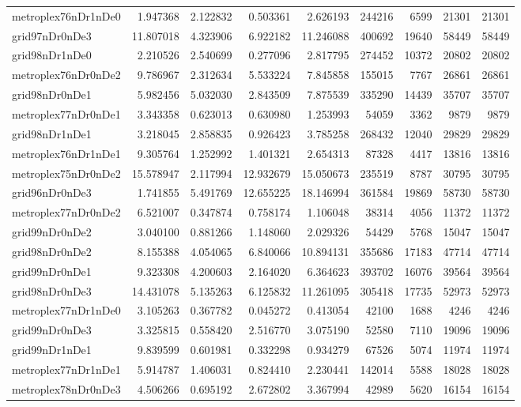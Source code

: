 \begin{longtable}{|l|r|r|r|r|r|r|r|r|}
metroplex76nDr1nDe0 & 1.947368 & 2.122832 & 0.503361 & 2.626193 & 244216 & 6599 & 21301 & 21301 \\
grid97nDr0nDe3 & 11.807018 & 4.323906 & 6.922182 & 11.246088 & 400692 & 19640 & 58449 & 58449 \\
grid98nDr1nDe0 & 2.210526 & 2.540699 & 0.277096 & 2.817795 & 274452 & 10372 & 20802 & 20802 \\
metroplex76nDr0nDe2 & 9.786967 & 2.312634 & 5.533224 & 7.845858 & 155015 & 7767 & 26861 & 26861 \\
grid98nDr0nDe1 & 5.982456 & 5.032030 & 2.843509 & 7.875539 & 335290 & 14439 & 35707 & 35707 \\
metroplex77nDr0nDe1 & 3.343358 & 0.623013 & 0.630980 & 1.253993 & 54059 & 3362 & 9879 & 9879 \\
grid98nDr1nDe1 & 3.218045 & 2.858835 & 0.926423 & 3.785258 & 268432 & 12040 & 29829 & 29829 \\
metroplex76nDr1nDe1 & 9.305764 & 1.252992 & 1.401321 & 2.654313 & 87328 & 4417 & 13816 & 13816 \\
metroplex75nDr0nDe2 & 15.578947 & 2.117994 & 12.932679 & 15.050673 & 235519 & 8787 & 30795 & 30795 \\
grid96nDr0nDe3 & 1.741855 & 5.491769 & 12.655225 & 18.146994 & 361584 & 19869 & 58730 & 58730 \\
metroplex77nDr0nDe2 & 6.521007 & 0.347874 & 0.758174 & 1.106048 & 38314 & 4056 & 11372 & 11372 \\
grid99nDr0nDe2 & 3.040100 & 0.881266 & 1.148060 & 2.029326 & 54429 & 5768 & 15047 & 15047 \\
grid98nDr0nDe2 & 8.155388 & 4.054065 & 6.840066 & 10.894131 & 355686 & 17183 & 47714 & 47714 \\
grid99nDr0nDe1 & 9.323308 & 4.200603 & 2.164020 & 6.364623 & 393702 & 16076 & 39564 & 39564 \\
grid98nDr0nDe3 & 14.431078 & 5.135263 & 6.125832 & 11.261095 & 305418 & 17735 & 52973 & 52973 \\
metroplex77nDr1nDe0 & 3.105263 & 0.367782 & 0.045272 & 0.413054 & 42100 & 1688 & 4246 & 4246 \\
grid99nDr0nDe3 & 3.325815 & 0.558420 & 2.516770 & 3.075190 & 52580 & 7110 & 19096 & 19096 \\
grid99nDr1nDe1 & 9.839599 & 0.601981 & 0.332298 & 0.934279 & 67526 & 5074 & 11974 & 11974 \\
metroplex77nDr1nDe1 & 5.914787 & 1.406031 & 0.824410 & 2.230441 & 142014 & 5588 & 18028 & 18028 \\
metroplex78nDr0nDe3 & 4.506266 & 0.695192 & 2.672802 & 3.367994 & 42989 & 5620 & 16154 & 16154 \\

\end{longtable}
